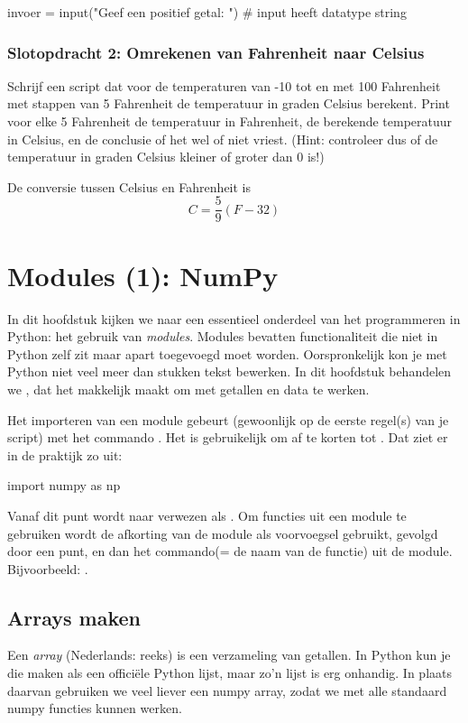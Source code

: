 \documentclass[a4paper,11pt, fleqn]{article}
\newcommand{\ditwc}{Naam van het huidige werkcollege}
\begin{document}
\begin{python}
invoer = input("Geef een positief getal: ")  # input heeft datatype string
\end{python}

\subsubsection{Slotopdracht 2: Omrekenen van Fahrenheit naar Celsius}
Schrijf een script dat voor de temperaturen van -10 tot en met 100 Fahrenheit met stappen van 5 Fahrenheit de temperatuur in graden Celsius berekent. Print voor elke 5 Fahrenheit de temperatuur in Fahrenheit, de berekende temperatuur in Celsius, en de conclusie of het wel of niet vriest. (Hint: controleer dus of de temperatuur in graden Celsius kleiner of groter dan 0 is!)

De conversie tussen Celsius en Fahrenheit is
\begin{equation}
C = \frac{5}{9}(F - 32)
\end{equation}

\clearpage
\renewcommand{\ditwc}{Modules (1): NumPy}
\section[Modules (1): NumPy]{\ditwc}
In dit hoofdstuk kijken we naar een essentieel onderdeel van het programmeren in Python: het gebruik van {\it modules}. Modules bevatten functionaliteit die niet in Python zelf zit maar apart toegevoegd moet worden. Oorspronkelijk kon je met Python niet veel meer dan stukken tekst bewerken. In dit hoofdstuk behandelen we , dat het makkelijk maakt om met getallen en data te werken.

Het importeren van een module gebeurt (gewoonlijk op de eerste regel(s) van je script) met het commando . Het is gebruikelijk om  af te korten tot . Dat ziet er in de praktijk zo uit: 
\begin{python}
import numpy as np
\end{python}
Vanaf dit punt wordt naar  verwezen als . Om functies uit een module te gebruiken wordt de afkorting van de module als voorvoegsel gebruikt, gevolgd door een punt, en dan het commando(= de naam van de functie) uit de module.\\
Bijvoorbeeld: .

\subsection{Arrays maken}
Een {\it array} (Nederlands: reeks) is een verzameling van getallen. In Python kun je die maken als een offici\"ele Python lijst, maar zo'n lijst is erg onhandig. In plaats daarvan gebruiken we veel liever een numpy array, zodat we met alle standaard numpy functies kunnen werken.
\end{document}
